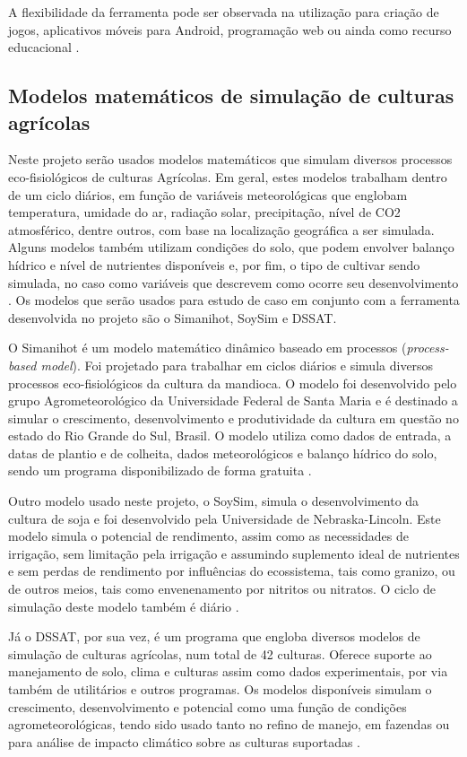 \documentclass[12pt]{article}
\begin{document}
	A flexibilidade da ferramenta pode ser observada na utilização para criação de jogos, aplicativos móveis para Android, programação web ou ainda como recurso educacional \cite{blocklyGames,blocklymobile,blocklyJavaScript,blocklyEducation}.

	\subsection{Modelos matemáticos de simulação de culturas agrícolas}

	Neste projeto serão usados modelos matemáticos que simulam diversos processos eco-fisiológicos de culturas Agrícolas. Em geral, estes modelos trabalham dentro de um ciclo diários, em função de variáveis meteorológicas que englobam temperatura, umidade do ar, radiação solar, precipitação, nível de CO2 atmosférico, dentre outros, com base na localização geográfica a ser simulada. Alguns modelos também utilizam condições do solo, que podem envolver balanço hídrico e nível de nutrientes disponíveis e, por fim, o tipo de cultivar sendo simulada, no caso como variáveis que descrevem como ocorre seu desenvolvimento \cite{simanihotArt}. Os modelos que serão usados para estudo de caso em conjunto com a ferramenta desenvolvida no projeto são o Simanihot, SoySim e DSSAT.

	O Simanihot é um modelo matemático dinâmico baseado em processos (\emph{process-based model}). Foi projetado para trabalhar em ciclos diários e simula diversos processos eco-fisiológicos da cultura da mandioca. O modelo foi desenvolvido pelo grupo Agrometeorológico da Universidade Federal de Santa Maria e é destinado a simular o crescimento, desenvolvimento e produtividade da cultura em questão no estado do Rio Grande do Sul, Brasil. O modelo utiliza como dados de entrada, a datas de plantio e de colheita, dados meteorológicos e balanço hídrico do solo, sendo um programa disponibilizado de forma gratuita \cite{Simanihot}.

	Outro modelo usado neste projeto, o SoySim, simula o desenvolvimento da cultura de soja e foi desenvolvido pela Universidade de Nebraska-Lincoln. Este modelo simula o potencial de rendimento, assim como as necessidades de irrigação, sem limitação pela irrigação e assumindo suplemento ideal de nutrientes e sem perdas de rendimento por influências do ecossistema, tais como granizo, ou de outros meios, tais como envenenamento por nitritos ou nitratos. O ciclo de simulação deste modelo também é diário \cite{SoySim}.

	Já o DSSAT, por sua vez, é um programa que engloba diversos modelos de simulação de culturas agrícolas, num total de 42 culturas. Oferece suporte ao manejamento de solo, clima e culturas assim como dados experimentais, por via também de utilitários e outros programas. Os modelos disponíveis simulam o crescimento, desenvolvimento e potencial como uma função de condições agrometeorológicas, tendo sido usado tanto no refino de manejo, em fazendas ou para análise de impacto climático sobre as culturas suportadas \cite{dssat}.
\end{document}
